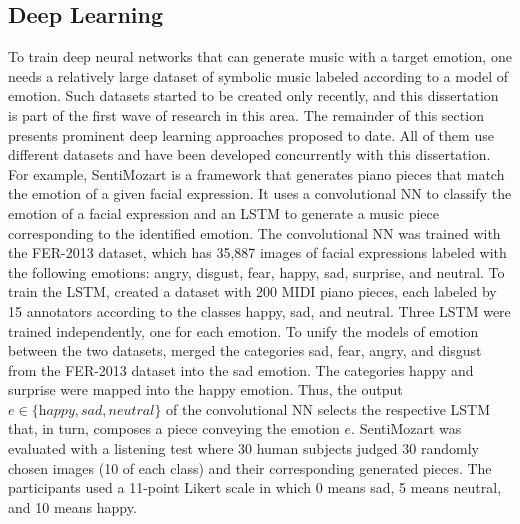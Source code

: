 \subsection{Deep Learning}

To train deep neural networks that can generate music with a target emotion, one needs a relatively large dataset of symbolic music labeled according to a model of emotion. Such datasets started to be created only recently, and this dissertation is part of the first wave of research in this area. The remainder of this section presents prominent deep learning approaches proposed to date. All of them use different datasets and have been developed concurrently with this dissertation. For example, SentiMozart \cite{madhok2018sentimozart} is a framework that generates piano pieces that match the emotion of a given facial expression. It uses a convolutional NN to classify the emotion of a facial expression and an LSTM to generate a music piece corresponding to the identified emotion. The convolutional NN was trained with the FER-2013 \cite{goodfellow2013challenges} dataset, which has 35,887 images of facial expressions labeled with the following emotions: angry, disgust, fear, happy, sad, surprise, and neutral. To train the LSTM, \citet{madhok2018sentimozart} created a dataset with 200 MIDI piano pieces, each labeled by 15 annotators according to the classes happy, sad, and neutral. Three LSTM were trained independently, one for each emotion. To unify the models of emotion between the two datasets, \citet{madhok2018sentimozart} merged the categories sad, fear, angry, and disgust from the FER-2013 dataset into the sad emotion. The categories happy and surprise were mapped into the happy emotion. Thus, the output $e \in \{\textit{happy}, \textit{sad}, \textit{neutral}\}$ of the convolutional NN selects the respective LSTM that, in turn, composes a piece conveying the emotion $e$. SentiMozart was evaluated with a listening test where 30 human subjects judged 30 randomly chosen images (10 of each class) and their corresponding generated pieces. The participants used a 11-point Likert scale in which 0 means sad, 5 means neutral, and 10 means happy.

